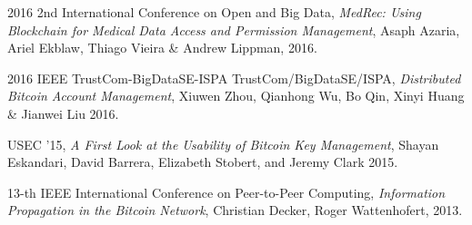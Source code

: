 \begin{thebibliography}{1}
  2016 2nd International Conference on Open and Big Data,
  \emph{MedRec: Using Blockchain for Medical Data Access and Permission
Management},
  Asaph Azaria, Ariel Ekblaw, Thiago Vieira \& Andrew Lippman,
  2016.

  2016 IEEE TrustCom-BigDataSE-ISPA TrustCom/BigDataSE/ISPA,
  \emph{Distributed Bitcoin Account Management},
  Xiuwen Zhou, Qianhong Wu, Bo Qin, Xinyi Huang \& Jianwei Liu
  2016.

  USEC ’15,
  \emph{A First Look at the Usability of Bitcoin Key Management},
  Shayan Eskandari, David Barrera, Elizabeth Stobert, and Jeremy Clark
  2015.

  13-th IEEE International Conference on Peer-to-Peer Computing,
  \emph{Information Propagation in the Bitcoin Network},
  Christian Decker, Roger Wattenhofert,
  2013.


\end{thebibliography}
